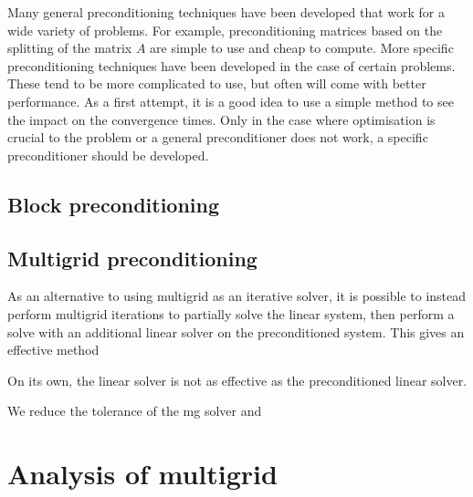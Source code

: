 Many general preconditioning techniques have been developed that work for a wide variety of problems.
For example, preconditioning matrices based on the splitting of the matrix $A$ are simple to use and cheap to compute.
More specific preconditioning techniques have been developed in the case of certain problems.
These tend to be more complicated to use, but often will come with better performance.
As a first attempt, it is a good idea to use a simple method to see the impact on the convergence times.
Only in the case where optimisation is crucial to the problem or a general preconditioner does not work, a specific preconditioner should be developed.



\subsection{Block preconditioning}



\subsection{Multigrid preconditioning}

As an alternative to using multigrid as an iterative solver, it is possible to instead perform multigrid iterations to partially solve the linear system, then perform a solve with an additional linear solver on the preconditioned system.
This gives an effective method  

On its own, the linear solver is not as effective as the preconditioned linear solver.



We reduce the tolerance of the mg solver and 






\section{Analysis of multigrid}

